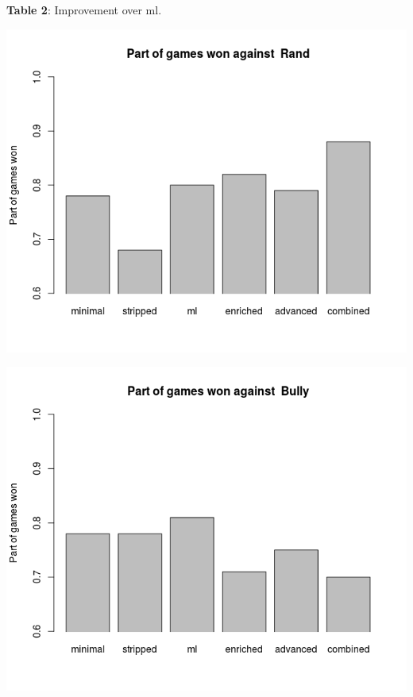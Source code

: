 \documentclass[a4paper,11pt]{article}
\begin{document}
\textbf{Table 2}: Improvement over ml. \\

\begin{center}
\begin{minipage}{0.49\linewidth}
\includegraphics[width=\linewidth]{images/barplotRand.png}
\end{minipage}
\hfill
\begin{minipage}{0.49\linewidth}
\includegraphics[width=\linewidth]{images/barplotBully.png}

\end{minipage}
\end{center}
\end{document}
